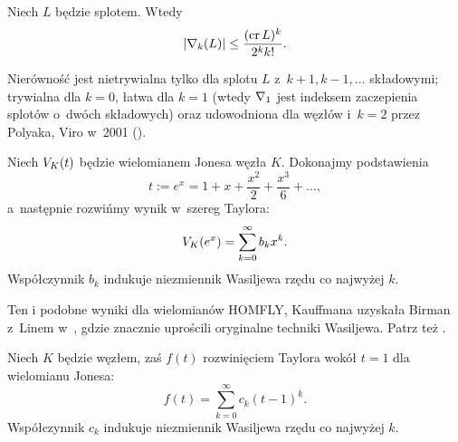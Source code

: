 \begin{conjecture}
    Niech $L$ będzie splotem.
    Wtedy
    \begin{equation}
        |\nabla_k(L)| \le \frac{(\operatorname{cr} L)^k}{2^kk!}.
    \end{equation}
\end{conjecture}

Nierówność jest nietrywialna tylko dla splotu $L$ z~$k+1, k-1, \ldots$ składowymi; trywialna dla $k = 0$, łatwa dla $k=1$ (wtedy $\nabla_1$ jest indeksem zaczepienia splotów o~dwóch składowych) oraz udowodniona dla węzłów i~$k=2$ przez Polyaka, Viro w~2001 (\cite{polyak01}).
%
%

\begin{example}
%
    Niech $V_K(t)$ będzie wielomianem Jonesa węzła $K$.
    Dokonajmy podstawienia
    \begin{equation}
        t := e^x = 1 + x + \frac{x^2}{2} + \frac{x^3}{6} + \ldots,
    \end{equation}
    a~następnie rozwińmy wynik w~szereg Taylora:
    \begin{equation}
        V_K(e^x) = \sum_{k = 0}^\infty b_k x^k.
    \end{equation}
    Współczynnik $b_{k}$ indukuje niezmiennik Wasiljewa rzędu co najwyżej $k$.
\end{example}

Ten i podobne wyniki dla wielomianów HOMFLY, Kauffmana uzyskała Birman z~Linem w~\cite{birman93}, gdzie znacznie uprościli oryginalne techniki Wasiljewa.
%
%
Patrz też \cite[s. 56]{chmutov12}.
%

\begin{example}
    Niech $K$ będzie węzłem, zaś $f(t)$ rozwinięciem Taylora wokół $t = 1$ dla wielomianu Jonesa:
    \begin{equation}
        f(t) = \sum_{k = 0}^\infty c_k (t-1)^k.
    \end{equation}
    Współczynnik $c_{k}$ indukuje niezmiennik Wasiljewa rzędu co najwyżej $k$.
\end{example}

